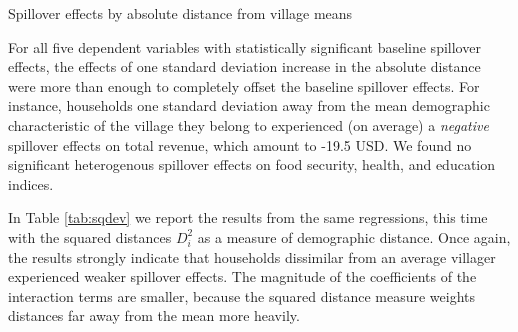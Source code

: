\documentclass[11pt]{article}
\begin{document}
    \begin{table}[H]
    \centering
    \caption{Spillover effects by absolute distance from village means}
    \label{tab:absdev}
    \end{table}

    For all five dependent variables with statistically significant baseline spillover effects, the effects of one standard deviation increase in the absolute distance were more than enough to completely offset the baseline spillover effects. For instance, households one standard deviation away from the mean demographic characteristic of the village they belong to experienced (on average) a \textit{negative} spillover effects on total revenue, which amount to -19.5 USD. We found no significant heterogenous spillover effects on food security, health, and education indices.

    In Table \ref{tab:sqdev} we report the results from the same regressions, this time with the squared distances $D_i^2$ as a measure of demographic distance. Once again, the results strongly indicate that households dissimilar from an average villager experienced weaker spillover effects. The magnitude of the coefficients of the interaction terms are smaller, because the squared distance measure weights distances far away from the mean more heavily.
\end{document}
